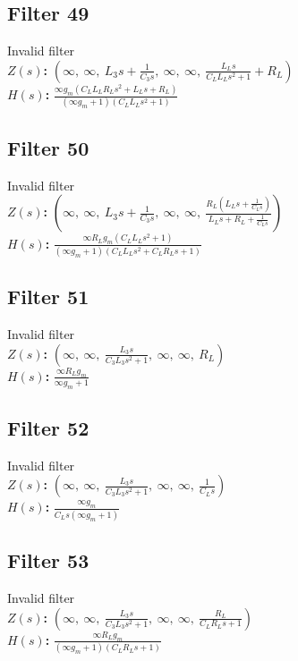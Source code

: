 \documentclass{article}
\begin{document}
\subsection*{Filter 49}
Invalid filter \\ 
\textbf{$Z(s)$:} $\left( \infty, \  \infty, \  L_{3} s + \frac{1}{C_{3} s}, \  \infty, \  \infty, \  \frac{L_{L} s}{C_{L} L_{L} s^{2} + 1} + R_{L}\right)$ \\ 
\textbf{$H(s)$:} $\frac{\infty g_{m} \left(C_{L} L_{L} R_{L} s^{2} + L_{L} s + R_{L}\right)}{\left(\infty g_{m} + 1\right) \left(C_{L} L_{L} s^{2} + 1\right)}$ \\ 
\subsection*{Filter 50}
Invalid filter \\ 
\textbf{$Z(s)$:} $\left( \infty, \  \infty, \  L_{3} s + \frac{1}{C_{3} s}, \  \infty, \  \infty, \  \frac{R_{L} \left(L_{L} s + \frac{1}{C_{L} s}\right)}{L_{L} s + R_{L} + \frac{1}{C_{L} s}}\right)$ \\ 
\textbf{$H(s)$:} $\frac{\infty R_{L} g_{m} \left(C_{L} L_{L} s^{2} + 1\right)}{\left(\infty g_{m} + 1\right) \left(C_{L} L_{L} s^{2} + C_{L} R_{L} s + 1\right)}$ \\ 
\subsection*{Filter 51}
Invalid filter \\ 
\textbf{$Z(s)$:} $\left( \infty, \  \infty, \  \frac{L_{3} s}{C_{3} L_{3} s^{2} + 1}, \  \infty, \  \infty, \  R_{L}\right)$ \\ 
\textbf{$H(s)$:} $\frac{\infty R_{L} g_{m}}{\infty g_{m} + 1}$ \\ 
\subsection*{Filter 52}
Invalid filter \\ 
\textbf{$Z(s)$:} $\left( \infty, \  \infty, \  \frac{L_{3} s}{C_{3} L_{3} s^{2} + 1}, \  \infty, \  \infty, \  \frac{1}{C_{L} s}\right)$ \\ 
\textbf{$H(s)$:} $\frac{\infty g_{m}}{C_{L} s \left(\infty g_{m} + 1\right)}$ \\ 
\subsection*{Filter 53}
Invalid filter \\ 
\textbf{$Z(s)$:} $\left( \infty, \  \infty, \  \frac{L_{3} s}{C_{3} L_{3} s^{2} + 1}, \  \infty, \  \infty, \  \frac{R_{L}}{C_{L} R_{L} s + 1}\right)$ \\ 
\textbf{$H(s)$:} $\frac{\infty R_{L} g_{m}}{\left(\infty g_{m} + 1\right) \left(C_{L} R_{L} s + 1\right)}$ \\ 
\end{document}
